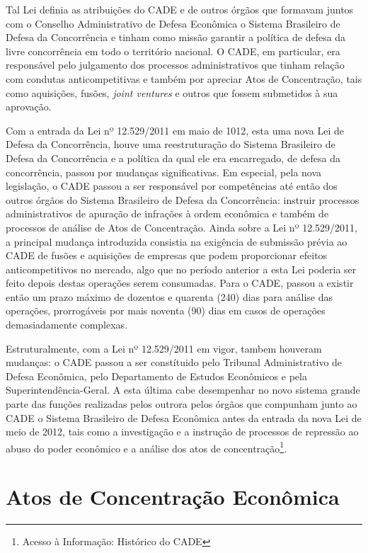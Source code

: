 \documentclass[11pt]{report}
\begin{document}
Tal Lei definia as atribuições do CADE e de outros órgãos que formavam juntos com o Conselho Administrativo de Defesa Econômica o Sistema Brasileiro de Defesa da Concorrência e tinham
como missão garantir a política de defesa da livre concorrência em todo o território nacional. O CADE, em particular, era responsável pelo julgamento dos processos administrativos
que tinham relação com condutas anticompetitivas e também por apreciar Atos de Concentração, tais como aquisições, fusões, \textit{joint ventures} e outros que fossem submetidos
à sua aprovação.

Com a entrada da Lei nº 12.529/2011 em maio de 1012, esta uma nova Lei de Defesa da Concorrência, houve uma reestruturação do Sistema Brasileiro de Defesa da Concorrência e a política
da qual ele era encarregado, de defesa da concorrência, passou por mudanças significativas. Em especial, pela nova legislação, o CADE passou a ser responsável por competências até
então dos outros órgãos do Sistema Brasileiro de Defesa da Concorrência: instruir processos administrativos de apuração de infrações à ordem econômica e também de processos de análise
de Atos de Concentração. Ainda sobre a Lei nº 12.529/2011, a principal mudança introduzida consistia na exigência de submissão
prévia ao CADE de fusões e aquisições de empresas que podem proporcionar efeitos anticompetitivos no mercado, algo que no período anterior a esta Lei poderia ser feito depois destas
operações serem consumadas. Para o CADE, passou a existir então um prazo máximo de dozentos e quarenta (240) dias para análise das operações, prorrogáveis por mais noventa (90) dias
em casos de operações demasiadamente complexas.

Estruturalmente, com a Lei nº 12.529/2011 em vigor, tambem houveram mudanças: o CADE passou a ser constítuido pelo Tribunal Administrativo de Defesa Econômica, pelo Departamento de
Estudos Econômicos e pela Superintendência-Geral. A esta última cabe desempenhar no novo sistema grande parte das funções realizadas pelos outrora pelos órgãos que compunham junto
ao CADE o Sistema Brasileiro de Defesa Econômica antes da entrada da nova Lei de meio de 2012, tais como a investigação e a instrução de processos de repressão ao abuso do poder
econômico e a análise dos atos de concentração\footnote[2]{Acesso à Informação: Histórico do CADE}.

\section{Atos de Concentração Econômica}
\end{document}
